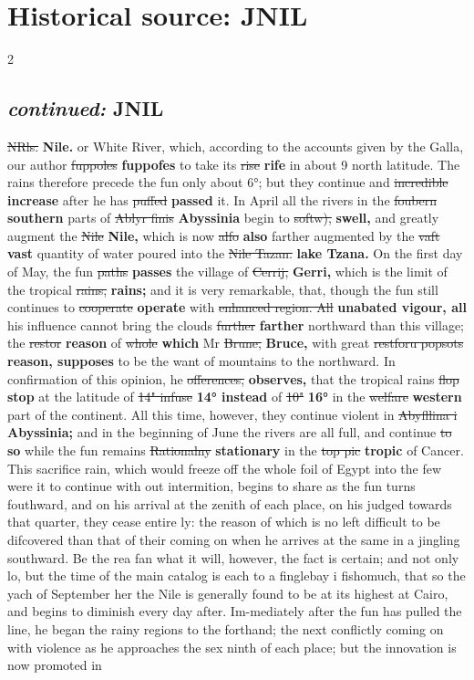 \documentclass[10pt]{article}
\begin{document}
\section*{Historical source: JNIL}
\begin{multicols}{2}
\subsection*{\textit{continued:} JNIL}
\sout{NRls.} \textbf{Nile.} or White River, which, according to the accounts given by the Galla, our author \sout{fuppoles} \textbf{fuppofes} to take its \sout{rise} \textbf{rife} in about 9 north latitude. The rains therefore precede the fun only about 6°; but they continue and \sout{incredible} \textbf{increase} after he has \sout{puffed} \textbf{passed} it. In April all the rivers in the \sout{foubern} \textbf{southern} parts of \sout{Ablyr finis} \textbf{Abyssinia} begin to \sout{softw),} \textbf{swell,} and greatly augment the \sout{Nile} \textbf{Nile,} which is now \sout{alfo} \textbf{also} farther augmented by the \sout{vaft} \textbf{vast} quantity of water poured into the \sout{Nile Tazan.} \textbf{lake Tzana.} On the first day of May, the fun \sout{paths} \textbf{passes} the village of \sout{Cerrij,} \textbf{Gerri,} which is the limit of the tropical \sout{rains,} \textbf{rains;} and it is very remarkable, that, though the fun still continues to \sout{cooperate} \textbf{operate} with \sout{enhanced region. All} \textbf{unabated vigour, all} his influence cannot bring the clouds \sout{further} \textbf{farther} northward than this village; the \sout{restor} \textbf{reason} of \sout{whole} \textbf{which} Mr \sout{Brune,} \textbf{Bruce,} with great \sout{restforu popsots} \textbf{reason, supposes} to be the want of mountains to the northward. In confirmation of this opinion, he \sout{offerences,} \textbf{observes,} that the tropical rains \sout{flop} \textbf{stop} at the latitude of \sout{14" infuse} \textbf{14° instead} of \sout{10"} \textbf{16°} in the \sout{welfare} \textbf{western} part of the continent. All this time, however, they continue violent in \sout{Abyfllina i} \textbf{Abyssinia;} and in the beginning of June the rivers are all full, and continue \sout{to} \textbf{so} while the fun remains \sout{Rationalny} \textbf{stationary} in the \sout{top pic} \textbf{tropic} of Cancer. This sacrifice rain, which would freeze off the whole foil of Egypt into the few were it to continue with out intermition, begins to share as the fun turns fouthward, and on his arrival at the zenith of each place, on his judged towards that quarter, they cease entire ly: the reason of which is no left difficult to be difcovered than that of their coming on when he arrives at the same in a jingling southward. Be the rea fan what it will, however, the fact is certain; and not only lo, but the time of the main catalog is each to a finglebay i fishomuch, that so the yach of September her the Nile is generally found to be at its highest at Cairo, and begins to diminish every day after. Im-mediately after the fun has pulled the line, he began the rainy regions to the forthand; the next conflictly coming on with violence as he approaches the sex ninth of each place; but the innovation is now promoted in 
\end{multicols}
\end{document}

